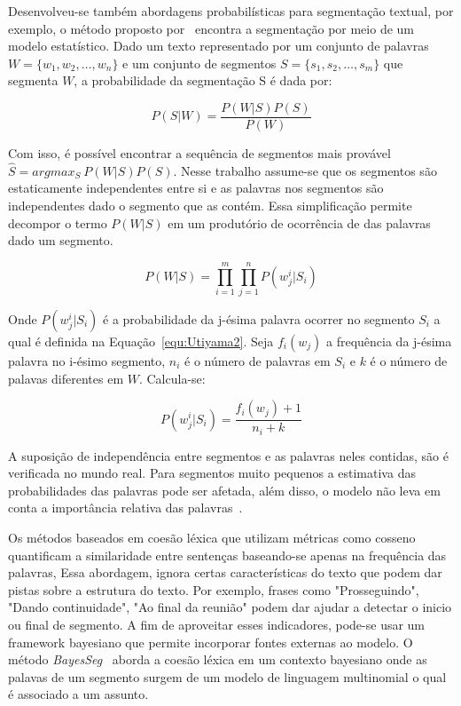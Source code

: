 





Desenvolveu-se também abordagens probabilísticas para segmentação textual, por exemplo, o método proposto por~\cite{Utiyama2001} encontra a segmentação por meio de um modelo estatístico. Dado um texto representado por um conjunto de palavras 
$W = \{w_1, w_2, \dots, w_n\}$ e um conjunto de segmentos $S = \{s_1, s_2, \dots, s_m\}$ que segmenta $W$, a probabilidade da segmentação S é dada por:

\begin{equation}
	P(S|W) = \frac{P(W|S)P(S)}{P(W)}
\end{equation}

Com isso, é possível encontrar a sequência de segmentos mais provável $\hat{S} = arg max_S~P(W|S) P(S)$. Nesse trabalho assume-se que os segmentos são estaticamente independentes entre si e as palavras nos segmentos são independentes dado o segmento que as contém. Essa simplificação permite decompor o termo $P(W|S)$ em um produtório de ocorrência de das palavras dado um segmento.  

\begin{equation}
	P(W|S) = \prod_{i=1}^m \prod_{j=1}^n P(w_j^i|S_i)
\end{equation}

Onde $P(w_j^i|S_i)$ é a probabilidade da j-ésima palavra ocorrer no segmento $S_i$ a qual é definida na Equação~\ref{equ:Utiyama2}. Seja $f_i(w_j)$ a frequência da j-ésima palavra no i-ésimo segmento, $n_i$ é o número de palavras em $S_i$ e $k$ é o número de palavas diferentes em $W$. Calcula-se: 

\begin{equation}
	P(w_j^i|S_i) = \frac{f_i(w_j) + 1}{n_i + k}
	\label{equ:Utiyama2}
\end{equation}

A suposição de independência entre segmentos e as palavras neles contidas, são é verificada no mundo real. Para segmentos muito pequenos a estimativa das probabilidades das palavras pode ser afetada, além disso, o modelo não leva em conta a importância relativa das palavras~\cite{Malioutov:2006a}.

 




Os métodos baseados em coesão léxica que utilizam métricas como cosseno quantificam a similaridade entre sentenças baseando-se apenas na frequência das palavras, Essa abordagem, ignora certas características do texto que podem dar pistas sobre a estrutura do texto. Por exemplo, frases como "Prosseguindo", "Dando continuidade", "Ao final da reunião" podem dar ajudar a detectar o inicio ou final de segmento. A fim de aproveitar esses indicadores, pode-se usar um framework bayesiano que permite incorporar fontes externas ao modelo. O método \textit{BayesSeg}~\cite{Eisenstein2008} aborda a coesão léxica em um contexto bayesiano onde as palavas de um segmento surgem de um modelo de linguagem multinomial o qual é associado a um assunto. 

